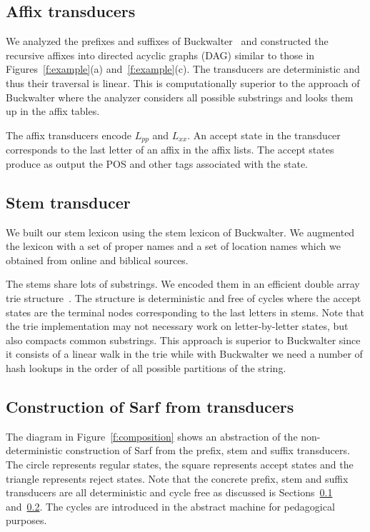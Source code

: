 \documentclass[11pt]{article}
\begin{document}

\subsection{Affix transducers}
\label{sec:affixFSA}

We analyzed the prefixes and suffixes of 
Buckwalter~
and constructed the recursive affixes
into directed acyclic graphs (DAG) similar to 
those in Figures~\ref{f:example}(a) and~\ref{f:example}(c).
The transducers are deterministic and thus 
their traversal is linear.
This is computationally superior to the 
approach of Buckwalter where the analyzer considers
all possible substrings %
and looks them up in the affix tables. 

The affix transducers encode $L_{pp}$ and
$L_{xx}$.
An accept state in the transducer corresponds to the last letter 
of an affix in the affix lists.
The accept states produce as output the POS and other tags
associated with the state.

\subsection{Stem transducer}
\label{sec:stemFSA}

We built our stem lexicon using the stem lexicon of 
Buckwalter. 
We augmented the lexicon with a set of proper names and
a set of location names which we 
obtained from online and biblical sources. 

The stems share lots of substrings. We encoded them in
an efficient double array trie structure~\cite{Aoe:89}. 
The structure is deterministic and free of cycles where the 
accept states are the terminal nodes corresponding to the last 
letters in stems. Note that the trie implementation may not 
necessary work on letter-by-letter states, but also compacts
common substrings.
This approach is superior to Buckwalter since it consists of
a linear walk in the trie while with Buckwalter we need
a number of hash lookups in the order of all possible partitions
of the string.

\subsection{Construction of Sarf from transducers}
\label{sec:ndfsa}

The diagram in Figure~\ref{f:composition} shows an 
abstraction of the non-deterministic construction of Sarf
from the prefix, stem and suffix transducers. 
The circle represents regular states, the square
represents accept states and the triangle represents
reject states. 
Note that the concrete prefix, stem and suffix transducers
are all deterministic and cycle free as discussed 
is Sections~\ref{sec:affixFSA} and~\ref{sec:stemFSA}.
The cycles are introduced in the abstract machine
for pedagogical purposes.
\end{document}
